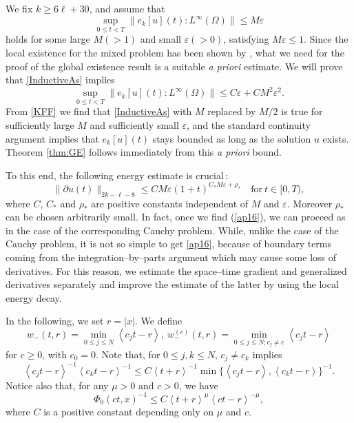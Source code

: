 \documentclass[12pt]{amsart}
\newcommand{\ve}{\varepsilon}
\newcommand{\jb}[1]{\left\langle #1 \right\rangle}
\newcommand{\norm}[2]{\|#1 \!:\! #2\|}
\numberwithin{equation}{section}
\begin{document}
We fix $k\ge 6\ell+30$, and
assume that
\begin{equation}
\sup_{0\le t<T} \norm{e_{k}[u](t)}{L^\infty(\Omega)} \le M\ve
\label{InductiveAs}
\end{equation}
holds for some large $M(>1)$ and small $\ve(>0)$, satisfying $M\ve \le 1$.
Since the local existence for the mixed problem has been shown by \cite{ShiTsu86}, what
we need for the proof of the global existence result
is %
a suitable {\it a priori} estimate. 
We will prove that %
\eqref{InductiveAs} implies
\begin{equation}
\label{KFF}
\sup_{0\le t<T} \norm{e_{k}[u](t)}{L^\infty(\Omega)} \le C\ve+CM^2\ve^2.
\end{equation}
From \eqref{KFF} we find that \eqref{InductiveAs} with $M$ replaced by
$M/2$ is true for sufficiently large $M$ and sufficiently small $\ve$,
and the standard continuity argument implies that $e_k[u](t)$ stays bounded
as long as the solution $u$ exists. Theorem \ref{thm:GE}
follows immediately from this {\it a priori} bound.

To this end, the following energy estimate is crucial\,:
\begin{equation}\label{ap16}
 \|\partial u(t)\|_{2k-\ell-8} \le C M\ve (1+t)^{C_* M\ve+\rho_*}
\quad \text{for} \ t \in [0,T),
\end{equation}
where $C$, $C_*$ and $\rho_*$ are positive constants independent of $M$ and $\ve$.
Moreover $\rho_*$ can be chosen arbitrarily small.
In fact, once we find (\ref{ap16}), we can proceed as in the 
case of the corresponding Cauchy problem.
While, unlike the case of the Cauchy problem, 
it is not so simple to get \eqref{ap16},
because of boundary terms coming from the integration--by--parts argument which may cause
some loss of derivatives. 
For this reason, we estimate the space--time gradient
and generalized derivatives separately and improve the estimate of the latter by using the local energy decay.

In the following, we set $r=|x|$. We define
$$
w_-(t,r)=\min_{0\le j\le N} \jb{c_jt-r},\ w_-^{(c)}(t,r)
=\min_{0\le j\le N; c_j\ne c} \jb{c_jt-r}
$$
for $c\ge 0$, with $c_0=0$. 
Note that, for $0\le j,k\le N$, $c_j\ne c_k$ implies
$$
 \jb{c_jt-r}^{-1}\jb{c_kt-r}^{-1}\le C \jb{t+r}^{-1} \min\{\jb{c_jt-r}, \jb{c_kt-r}\}^{-1}.
$$
Notice also that, for any $\mu>0$ and $c>0$, we have
$$
\Phi_0(ct, x)^{-1}\le C \jb{t+r}^\mu \jb{ct-r}^{-\mu},
$$
where $C$ is a positive constant depending only on 
$\mu$ and $c$.
\end{document}
